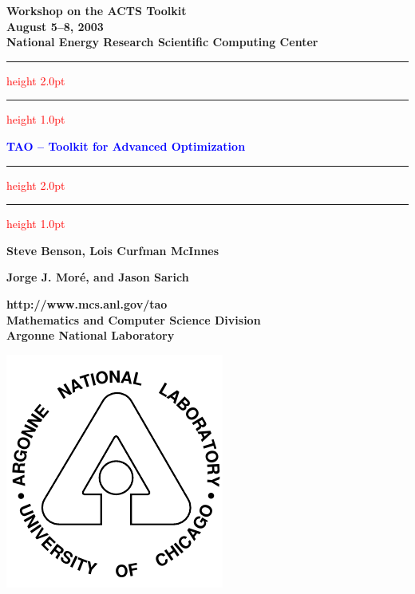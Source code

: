 \documentclass{seminar}
\newcommand{\redstripe}{\textcolor{red}{\hrule height 2.0pt\hfil}
             \vspace{-1.8pt}
             \textcolor{red}{\hrule height 1.0pt\hfil}
}
\begin{document}
\begin{slide}

\begin{center}
{\bf
Workshop on the ACTS Toolkit \\
August 5--8, 2003 \\
National Energy Research Scientific Computing Center
}
\end{center}

\redstripe

\begin{center}
{\bf
\textcolor{blue}{TAO -- Toolkit for Advanced Optimization}
}

\redstripe

\medskip

\centerline{\bf Steve Benson, Lois Curfman McInnes} 
\centerline{\bf Jorge J. Mor\'e, and Jason Sarich}

\end{center}


\parbox[b]{3in}{\bf http://www.mcs.anl.gov/tao \bigskip \\
\small  Mathematics and Computer Science Division \\ 
Argonne National Laboratory} \includegraphics[scale=0.5]{../images//argonne}

\end{slide}
\end{document}

